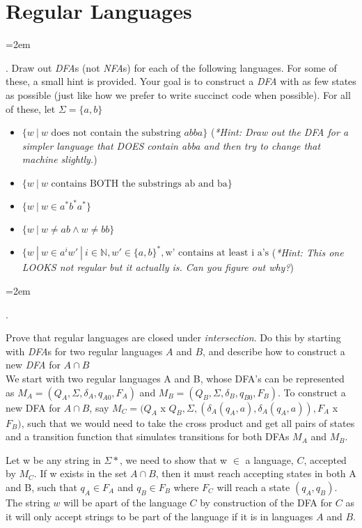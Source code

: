 \documentclass[12pt]{article}
\def\homework{Regular Languages}
\newcounter{quesnum}
\newcommand{\question}[2][??]{
\begin{list}{\labelitemi}{\leftmargin=2em}
\item [\arabic{quesnum}.] {} {#2}
\end{list}
\addtocounter{quesnum}{1}
}
\begin{document}
\section*{\homework}

\question[3]{
Draw out \emph{DFA}s (not \emph{NFA}s) for each of the following languages. For some of these, a small hint is provided. Your goal is to construct a \emph{DFA} with as few states as possible (just like how we prefer to write succinct code when possible). For all of these, let $\Sigma = \{a,b\}$
}

\begin{itemize}
	\item $\{w \ | \ w \text{ does not contain the substring } abba \}$ (\emph{*Hint: Draw out the DFA for a simpler language that DOES contain abba and then try to change that machine slightly.})
	\item $\{w \ | \ w \text{ contains BOTH the substrings ab and ba}\}$
	\item $\{w \ | \ w \in a^*b^*a^* \}$
	\item $\{w \ | \ w \neq ab \wedge w \neq bb \}$
	\item $\{w \ | \ w \in a^iw' \ | \ i \in \mathbb{N}, w' \in \{a,b\}^*, \text{w' contains at least i a's} $ (\emph{*Hint: This one LOOKS not regular but it actually is. Can you figure out why?})
\end{itemize}

\vspace{12pt}

\question[3]{
Prove that regular languages are closed under \emph{intersection}. Do this by starting with \emph{DFA}s for two regular languages $A$ and $B$, and describe how to construct a new \emph{DFA} for $A \cap B$\
\\

We start with two regular languages A and B, whose DFA's can be represented as $M_A = (Q_A, \Sigma, \delta_A, q_{A0}, F_A)$ and $M_B = (Q_B, \Sigma, \delta_B, q_{B0}, F_B)$. To construct a new DFA for $A \cap B$, say $M_C = (Q_A $ x $ Q_B, \Sigma, (\delta_A(q_A,a),\delta_A(q_A,a)) ,F_A $ x $ F_B)$, such that we would need to take the cross product and get all pairs of states and a transition function that simulates transitions for both DFAs $M_A $ and $ M_B$. 

Let w be any string in $\Sigma*$, we need to show that w $\in$ a language, $C$, accepted by $M_C$. If w exists in the set $A \cap B$, then it must reach accepting states in both A and B, such that $q_A \in F_A$ and $q_B \in F_B$ where $F_C$ will reach a state $(q_A, q_B)$. The string $w$ will be apart of the language $C$ by construction of the DFA for $C$ as it will only accept strings to be part of the language if it is in languages $A$ and $B$.
}
\end{document}
